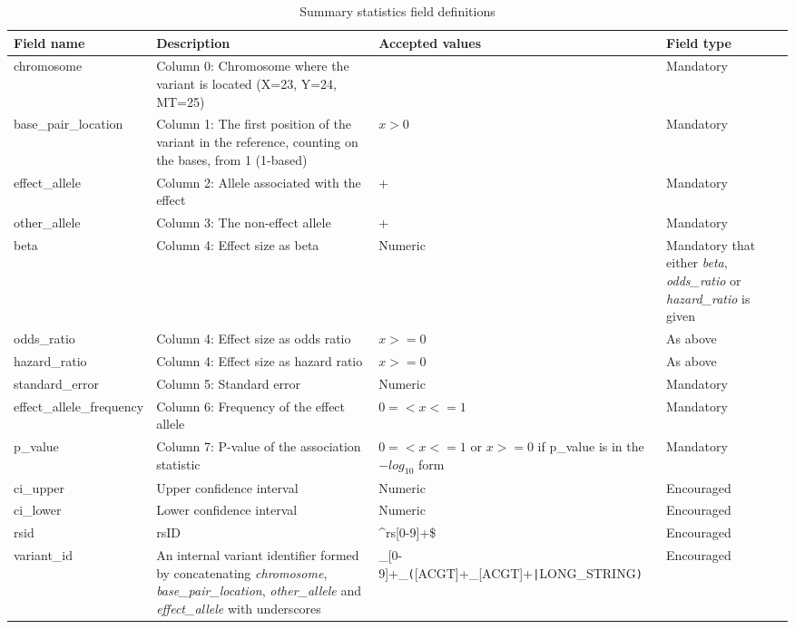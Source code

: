 \documentclass[11pt]{article}
\begin{document}
\begin{landscape}
\begin{table}[h]
 \begin{threeparttable}
  \caption{Summary statistics field definitions}
  \centering
  \small
  \begin{tabularx}{\linewidth} { 
    | >{\hsize=0.7\hsize\centering\arraybackslash}X 
    | >{\hsize=1\hsize\centering\arraybackslash}X 
    | >{\hsize=1.9\hsize\centering\arraybackslash}X 
    | >{\hsize=0.4\hsize\centering\arraybackslash}X | } 
   \hline
   Field name & Description & Accepted values & Field type \\
   \hline
   chromosome & Column 0: Chromosome where the variant is located (X=23, Y=24, MT=25) & [1-25] & Mandatory\\
   base\_pair\_location & Column 1: The first position of the variant in the reference, counting on the bases, from 1 (1-based) & $x > 0$ & Mandatory\\
   effect\_allele & Column 2: Allele associated with the effect & [ACGT]+ & Mandatory\\
   other\_allele & Column 3: The non-effect allele & [ACGT]+ & Mandatory\\
   beta & Column 4: Effect size as beta & Numeric & Mandatory that either \textit{beta}, \textit{odds\_ratio} or \textit{hazard\_ratio} is given\\
   odds\_ratio & Column 4: Effect size as odds ratio & $x >= 0$ & As above\\
   hazard\_ratio & Column 4: Effect size as hazard ratio & $x >= 0$ & As above\\
   standard\_error & Column 5: Standard error & Numeric & Mandatory\\
   effect\_allele\_frequency & Column 6: Frequency of the effect allele & $0 =< x <=1$\tnote{b} & Mandatory\\
   p\_value & Column 7: P-value of the association statistic & $0 =< x <= 1$ or $x >= 0$ if p\_value is in the $-log_{10}$ form\tnote{a} & Mandatory \\
   ci\_upper & Upper confidence interval & Numeric & Encouraged\\
   ci\_lower & Lower confidence interval & Numeric & Encouraged\\
   rsid & rsID & \^{}rs[0-9]+\$ & Encouraged\\
   variant\_id & An internal variant identifier formed by concatenating \textit{chromosome}, \textit{base\_pair\_location}, \textit{other\_allele} and \textit{effect\_allele} with underscores & [1-25]\_[0-9]+\_\texttt{(}[ACGT]+\_[ACGT]+\texttt{|}LONG\_STRING\texttt{)}\tnote{c} & Encouraged\\

\end{tabularx}
\end{threeparttable}
\end{table}
\end{landscape}
\end{document}
